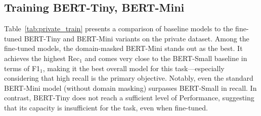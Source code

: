 \subsection{Training BERT-Tiny, BERT-Mini}

Table~\ref{tab:private_train} presents a comparison of baseline models to the fine-tuned BERT-Tiny and BERT-Mini variants on the private dataset. Among the fine-tuned models, the domain-masked BERT-Mini stands out as the best. It achieves the highest Rec$_1$ and comes very close to the BERT-Small baseline in terms of F1$_1$, making it the best overall model for this task—especially considering that high recall is the primary objective. Notably, even the standard BERT-Mini model (without domain masking) surpasses BERT-Small in recall. In contrast, BERT-Tiny does not reach a sufficient level of Performance, suggesting that its capacity is insufficient for the task, even when fine-tuned.

\begin{table}[H]
    \centering
    \caption{Results on the private dataset. All models listed in the lower section were trained using hyper-parameters derived from an ablation study conducted on the private dataset (Abl Priv.). The domain-masked BERT-mini (DM) was also trained using Abl. Priv. parameters, but only two epochs, as the number of training samples effectively doubled.}
    \label{tab:private_train}
\end{table}

